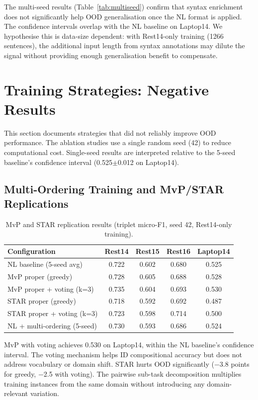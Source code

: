 \documentclass[12pt,a4paper]{report}
\begin{document}
The multi-seed results (Table~\ref{tab:multiseed}) confirm that syntax enrichment does not significantly help OOD generalisation once the NL format is applied. The confidence intervals overlap with the NL baseline on Laptop14. We hypothesise this is data-size dependent: with Rest14-only training (1266 sentences), the additional input length from syntax annotations may dilute the signal without providing enough generalisation benefit to compensate.


\section{Training Strategies: Negative Results}\label{sec:negative}

This section documents strategies that did not reliably improve OOD performance. The ablation studies use a single random seed (42) to reduce computational cost. Single-seed results are interpreted relative to the 5-seed baseline's confidence interval (0.525$\pm$0.012 on Laptop14).

\subsection{Multi-Ordering Training and MvP/STAR Replications}\label{sec:mvp-star}

\begin{table}[H]
\centering
\caption{MvP and STAR replication results (triplet micro-F1, seed 42, Rest14-only training).}
\label{tab:mvp-star}
\small
\begin{tabular}{@{}lcccc@{}}
\toprule
\textbf{Configuration} & \textbf{Rest14} & \textbf{Rest15} & \textbf{Rest16} & \textbf{Laptop14} \\
\midrule
NL baseline (5-seed avg) & 0.722 & 0.602 & 0.680 & 0.525 \\
\midrule
MvP proper (greedy) & 0.728 & 0.605 & 0.688 & 0.528 \\
MvP proper + voting (k=3) & 0.735 & 0.604 & 0.693 & 0.530 \\
STAR proper (greedy) & 0.718 & 0.592 & 0.692 & 0.487 \\
STAR proper + voting (k=3) & 0.723 & 0.598 & 0.714 & 0.500 \\
\midrule
NL + multi-ordering (5-seed) & 0.730 & 0.593 & 0.686 & 0.524 \\
\bottomrule
\end{tabular}
\end{table}

MvP with voting achieves 0.530 on Laptop14, within the NL baseline's confidence interval. The voting mechanism helps ID compositional accuracy but does not address vocabulary or domain shift. STAR hurts OOD significantly ($-$3.8 points for greedy, $-$2.5 with voting). The pairwise sub-task decomposition multiplies training instances from the same domain without introducing any domain-relevant variation.
\end{document}
